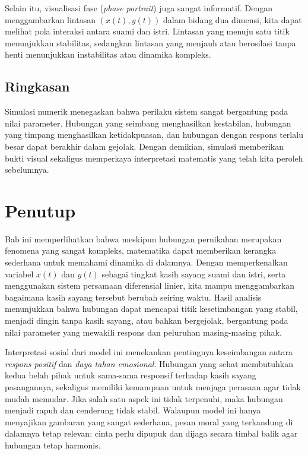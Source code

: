 \documentclass{bukumjh}
\begin{document}
Selain itu, visualisasi fase (\emph{phase portrait}) juga sangat informatif. 
Dengan menggambarkan lintasan $(x(t), y(t))$ dalam bidang dua dimensi, kita dapat melihat pola interaksi antara suami dan istri. 
Lintasan yang menuju satu titik menunjukkan stabilitas, sedangkan lintasan yang menjauh atau berosilasi tanpa henti menunjukkan instabilitas atau dinamika kompleks.

\subsection*{Ringkasan}
Simulasi numerik menegaskan bahwa perilaku sistem sangat bergantung pada nilai parameter. 
Hubungan yang seimbang menghasilkan kestabilan, hubungan yang timpang menghasilkan ketidakpuasan, dan hubungan dengan respons terlalu besar dapat berakhir dalam gejolak. 
Dengan demikian, simulasi memberikan bukti visual sekaligus memperkaya interpretasi matematis yang telah kita peroleh sebelumnya.

\section{Penutup}

Bab ini memperlihatkan bahwa meskipun hubungan pernikahan merupakan fenomena yang sangat kompleks, matematika dapat memberikan kerangka sederhana untuk memahami dinamika di dalamnya. 
Dengan memperkenalkan variabel $x(t)$ dan $y(t)$ sebagai tingkat kasih sayang suami dan istri, serta menggunakan sistem persamaan diferensial linier, kita mampu menggambarkan bagaimana kasih sayang tersebut berubah seiring waktu. 
Hasil analisis menunjukkan bahwa hubungan dapat mencapai titik kesetimbangan yang stabil, menjadi dingin tanpa kasih sayang, atau bahkan bergejolak, bergantung pada nilai parameter yang mewakili respons dan peluruhan masing-masing pihak.

Interpretasi sosial dari model ini menekankan pentingnya keseimbangan antara \emph{respons positif} dan \emph{daya tahan emosional}. 
Hubungan yang sehat membutuhkan kedua belah pihak untuk sama-sama responsif terhadap kasih sayang pasangannya, sekaligus memiliki kemampuan untuk menjaga perasaan agar tidak mudah memudar. 
Jika salah satu aspek ini tidak terpenuhi, maka hubungan menjadi rapuh dan cenderung tidak stabil. 
Walaupun model ini hanya menyajikan gambaran yang sangat sederhana, pesan moral yang terkandung di dalamnya tetap relevan: cinta perlu dipupuk dan dijaga secara timbal balik agar hubungan tetap harmonis.
\end{document}
